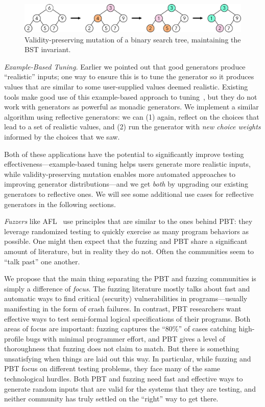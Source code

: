 \begin{figure}[h]
  \centering
  \includegraphics[width=.6\textwidth]{assets/mutate-diagram.pdf}
  \caption{Validity-preserving mutation of a binary search tree, maintaining the
  BST invariant.}\label{fig:mutation}
\end{figure}

{\em Example-Based Tuning.} Earlier we pointed out that good generators
produce ``realistic'' inputs; one way to ensure this is to tune the generator so
it produces values that are similar to some user-supplied values deemed
realistic. Existing tools make good use of this example-based approach to
tuning~\cite{soremekun2020inputs}, but they do not work with generators as
powerful as monadic generators. We implement a similar algorithm using
reflective generators: we can (1) again, reflect on the choices that lead to a
set of realistic values, and (2) run the generator with {\em new choice weights}
informed by the choices that we saw.

Both of these applications have the potential to significantly improve
testing effectiveness---example-based tuning helps users generate more
realistic inputs, while validity-preserving mutation enables more
automated approaches to improving generator distributions---and we get
{\em both} by upgrading our existing generators to reflective ones. We
will see some additional use cases for reflective generators in the
following sections.

{\em Fuzzers} like AFL~\cite{afl-readme} use principles that are similar to the
ones behind PBT: they leverage randomized testing to quickly exercise as
many program behaviors as possible.  One might then expect that the fuzzing and
PBT share a significant amount of literature, but in reality they do not. Often
the communities seem to ``talk past'' one another.

We propose that the main thing separating the PBT and fuzzing communities is
simply a difference of {\em focus}. The fuzzing literature mostly talks about
fast and automatic ways to find critical (security) vulnerabilities in
programs---usually manifesting in the form of crash failures.  In contrast, PBT
researchers want effective ways to test semi-formal logical specifications of
their programs. Both areas of focus are important: fuzzing captures the ``80\%''
of cases catching high-profile bugs with minimal programmer effort, and PBT
gives a level of thoroughness that fuzzing does not claim to match. But there is
something unsatisfying when things are laid out this way. In particular, while
fuzzing and PBT focus on different testing problems, they face many of the same
technological hurdles. Both PBT and fuzzing need fast and effective ways to
generate random inputs that are valid for the systems that they are testing, and
neither community has truly settled on the ``right'' way to get there.

